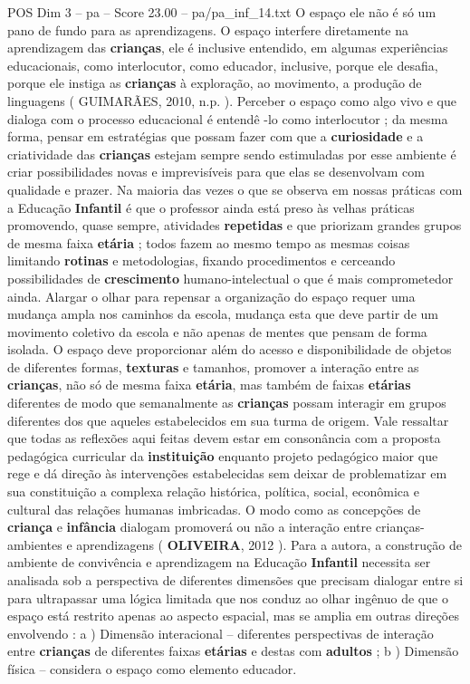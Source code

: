\begin{textsample}{POS Dim 3 – pa – Score 23.00 – pa/pa\_inf\_14.txt}
O espaço ele não é só um pano de fundo para as aprendizagens.
O espaço interfere diretamente na aprendizagem das \textbf{crianças}, ele é inclusive entendido, em algumas experiências educacionais, como interlocutor, como educador, inclusive, porque ele desafia, porque ele instiga as \textbf{crianças} à exploração, ao movimento, a produção de linguagens ( GUIMARÃES, 2010, n.p. ).
Perceber o espaço como algo vivo e que dialoga com o processo educacional é entendê -lo como interlocutor ; da mesma forma, pensar em estratégias que possam fazer com que a \textbf{curiosidade} e a criatividade das \textbf{crianças} estejam sempre sendo estimuladas por esse ambiente é criar possibilidades novas e imprevisíveis para que elas se desenvolvam com qualidade e prazer.
Na maioria das vezes o que se observa em nossas práticas com a Educação \textbf{Infantil} é que o professor ainda está preso às velhas práticas promovendo, quase sempre, atividades \textbf{repetidas} e que priorizam grandes grupos de mesma faixa \textbf{etária} ; todos fazem ao mesmo tempo as mesmas coisas limitando \textbf{rotinas} e metodologias, fixando procedimentos e cerceando possibilidades de \textbf{crescimento} humano-intelectual o que é mais comprometedor ainda.
Alargar o olhar para repensar a organização do espaço requer uma mudança ampla nos caminhos da escola, mudança esta que deve partir de um movimento coletivo da escola e não apenas de mentes que pensam de forma isolada.
O espaço deve proporcionar além do acesso e disponibilidade de objetos de diferentes formas, \textbf{texturas} e tamanhos, promover a interação entre as \textbf{crianças}, não só de mesma faixa \textbf{etária}, mas também de faixas \textbf{etárias} diferentes de modo que semanalmente as \textbf{crianças} possam interagir em grupos diferentes dos que aqueles estabelecidos em sua turma de origem.
Vale ressaltar que todas as reflexões aqui feitas devem estar em consonância com a proposta pedagógica curricular da \textbf{instituição} enquanto projeto pedagógico maior que rege e dá direção às intervenções estabelecidas sem deixar de problematizar em sua constituição a complexa relação histórica, política, social, econômica e cultural das relações humanas imbricadas.
O modo como as concepções de \textbf{criança} e \textbf{infância} dialogam promoverá ou não a interação entre crianças- ambientes e aprendizagens ( \textbf{OLIVEIRA}, 2012 ).
Para a autora, a construção de ambiente de convivência e aprendizagem na Educação \textbf{Infantil} necessita ser analisada sob a perspectiva de diferentes dimensões que precisam dialogar entre si para ultrapassar uma lógica limitada que nos conduz ao olhar ingênuo de que o espaço está restrito apenas ao aspecto espacial, mas se amplia em outras direções envolvendo : a ) Dimensão interacional – diferentes perspectivas de interação entre \textbf{crianças} de diferentes faixas \textbf{etárias} e destas com \textbf{adultos} ; b ) Dimensão física – considera o espaço como elemento educador.

\end{textsample}

